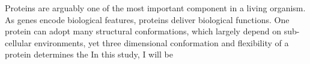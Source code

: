 Proteins are arguably one of the most important component in a living organism. As genes encode biological features, proteins deliver biological functions. One protein can adopt many structural conformations, which largely depend on sub-cellular environments, yet three dimensional conformation and flexibility of a protein determines the     In this study, I will be 